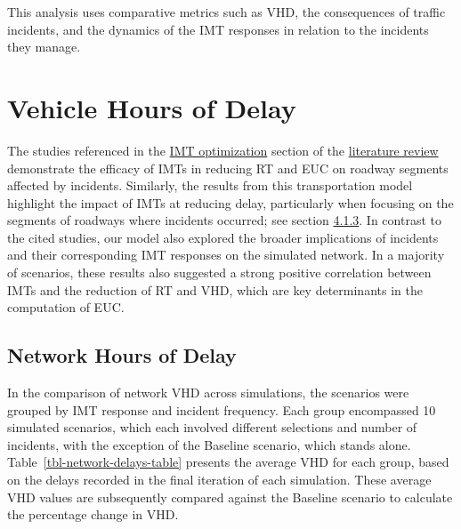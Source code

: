 \documentclass[fancy, oneside, mastersfancy, ms]{byuthesis}
\begin{document}
This analysis uses comparative metrics such as VHD, the consequences of
traffic incidents, and the dynamics of the IMT responses in relation to
the incidents they manage.

\hypertarget{vehicle-hours-of-delay}{%
\section{Vehicle Hours of Delay}\label{vehicle-hours-of-delay}}

The studies referenced in the \protect\hyperlink{sec-lit_imt_opt}{IMT
optimization} section of the
\protect\hyperlink{sec-literature}{literature review} demonstrate the
efficacy of IMTs in reducing RT and EUC on roadway segments affected by
incidents. Similarly, the results from this transportation model
highlight the impact of IMTs at reducing delay, particularly when
focusing on the segments of roadways where incidents occurred; see
section \protect\hyperlink{sec-impacted}{4.1.3}. In contrast to the
cited studies, our model also explored the broader implications of
incidents and their corresponding IMT responses on the simulated
network. In a majority of scenarios, these results also suggested a
strong positive correlation between IMTs and the reduction of RT and
VHD, which are key determinants in the computation of EUC.

\hypertarget{sec-VHD-Network}{%
\subsection{Network Hours of Delay}\label{sec-VHD-Network}}

In the comparison of network VHD across simulations, the scenarios were
grouped by IMT response and incident frequency. Each group encompassed
10 simulated scenarios, which each involved different selections and
number of incidents, with the exception of the Baseline scenario, which
stands alone. Table~\ref{tbl-network-delays-table} presents the average
VHD for each group, based on the delays recorded in the final iteration
of each simulation. These average VHD values are subsequently compared
against the Baseline scenario to calculate the percentage change in VHD.
\end{document}
